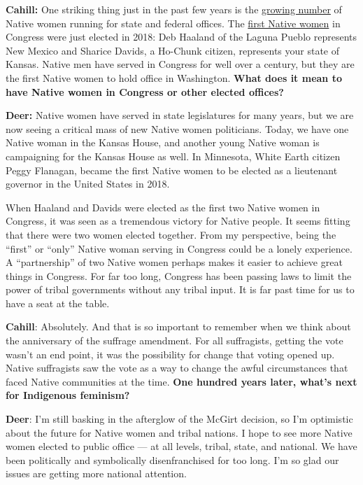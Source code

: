 \textbf{Cahill:} One striking thing just in the past few years is the
\href{https://www.npr.org/2018/07/04/625425037/record-number-of-native-americans-running-for-office-in-midterms}{growing
number} of Native women running for state and federal offices. The
\href{https://www.nytimes3xbfgragh.onion/2018/11/07/us/elections/native-americans-congress-haaland-davids.html}{first
Native women} in Congress were just elected in 2018: Deb Haaland of the
Laguna Pueblo represents New Mexico and Sharice Davids, a Ho-Chunk
citizen, represents your state of Kansas. Native men have served in
Congress for well over a century, but they are the first Native women to
hold office in Washington. \textbf{What does it mean to have Native
women in Congress or other elected offices?}

\textbf{Deer:} Native women have served in state legislatures for many
years, but we are now seeing a critical mass of new Native women
politicians. Today, we have one Native woman in the Kansas House, and
another young Native woman is campaigning for the Kansas House as well.
In Minnesota, White Earth citizen Peggy Flanagan, became the first
Native women to be elected as a lieutenant governor in the United States
in 2018.

When Haaland and Davids were elected as the first two Native women in
Congress, it was seen as a tremendous victory for Native people. It
seems fitting that there were two women elected together. From my
perspective, being the ``first'' or ``only'' Native woman serving in
Congress could be a lonely experience. A ``partnership'' of two Native
women perhaps makes it easier to achieve great things in Congress. For
far too long, Congress has been passing laws to limit the power of
tribal governments without any tribal input. It is far past time for us
to have a seat at the table.

\textbf{Cahill}: Absolutely. And that is so important to remember when
we think about the anniversary of the suffrage amendment. For all
suffragists, getting the vote wasn't an end point, it was the
possibility for change that voting opened up. Native suffragists saw the
vote as a way to change the awful circumstances that faced Native
communities at the time. \textbf{One hundred years later, what's next
for Indigenous feminism?}

\textbf{Deer}: I'm still basking in the afterglow of the McGirt
decision, so I'm optimistic about the future for Native women and tribal
nations. I hope to see more Native women elected to public office --- at
all levels, tribal, state, and national. We have been politically and
symbolically disenfranchised for too long. I'm so glad our issues are
getting more national attention.

